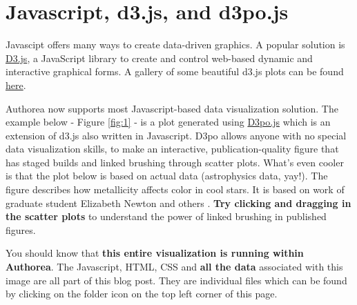 \section{Javascript, d3.js, and d3po.js}

Javascipt offers many ways to create data-driven graphics. A popular solution is \href{http://d3js.org/}{D3.js}, a JavaScript library to create and control web-based dynamic and interactive graphical forms. A gallery of some beautiful d3.js plots can be found \href{https://github.com/mbostock/d3/wiki/Gallery}{here}.

Authorea now supports most Javascript-based data visualization solution. The example below - Figure \ref{fig:1} - is a plot generated using \href{http://d3pojs.org/}{D3po.js} which is an extension of d3.js also written in Javascript. D3po allows anyone with no special data visualization skills, to make an interactive, publication-quality figure that has staged builds and linked brushing through scatter plots. What's even cooler is that the plot below is based on actual data (astrophysics data, yay!). The figure describes how metallicity affects color in cool stars. It is based on work of graduate student Elizabeth Newton and others \cite{2014AJ....147...20N}. \textbf{Try clicking and dragging in the scatter plots} to understand the power of linked brushing in published figures.

You should know that \textbf{this entire visualization is running within Authorea}. The Javascript, HTML, CSS and \textbf{all the data} associated with this image are all part of this blog post. They are individual files which can be found by clicking on the folder icon on the top left corner of this page.

 